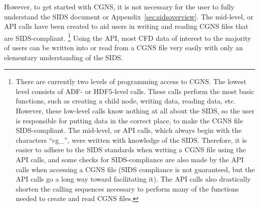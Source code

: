 \documentclass[12pt]{article}
\begin{document}
However, to get started with CGNS, it is not necessary
for the user to fully understand the SIDS document or Appendix~\ref{sec:sidsoverview}.  
The mid-level, or API calls have been created to aid users
in writing and reading CGNS files that are SIDS-compliant.  
\footnote{There are currently two levels of programming access to CGNS.
The lowest level consists of ADF- or HDF5-level calls.  These calls
perform the most basic functions, such as creating a child node,
writing data, reading data, etc.
However, these low-level calls know nothing at all about the SIDS,
so the user is responsible for putting data in the correct 
place, to make the CGNS file SIDS-compliant.
The mid-level, or API calls, which always begin with the characters
``cg\_'', were written with knowledge of the SIDS.
Therefore, it is easier to adhere to the SIDS standards when
writing a CGNS file using the API calls, and some checks for
SIDS-compliance are also made by the API calls when accessing a CGNS file
(SIDS compliance is not guaranteed, but the API calls
go a long way toward facilitating it).  The API calls also
drastically shorten the calling sequences necessary to perform
many of the functions needed to create and read CGNS files.}
Using the API, most CFD data of interest to the majority of users can be
written into or read from a CGNS file very easily with only an
elementary understanding of the SIDS.

\end{document}
